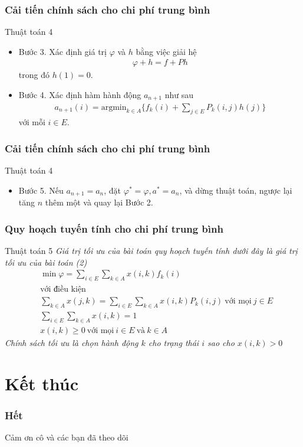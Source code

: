 \documentclass[12pt]{beamer}
\begin{document}
\begin{frame}
	\frametitle{ Cải tiến chính sách cho chi phí trung bình}
	\begin{block}{Thuật toán 4}
		\begin{itemize}
			\item
	 	Bước 3. Xác định giá trị $\varphi$ và $h$ bằng việc giải hệ
	\begin{align*}
	\varphi +h=f +Ph
	\end{align*} 
	trong đó $h(1)=0$.
	
\item
	Bước 4. Xác định hàm hành động $a_{n+1}$ như sau
	\begin{align*}
	a_{n+1}(i)=\mathrm{argmin}_{k \in A}\{f_k(i)+\sum_{j\in E}P_k(i,j)h(j)\}
	\end{align*}
	với mỗi $i \in E$.

		\end{itemize}
	\end{block}
\end{frame}

\begin{frame}
	\frametitle{ Cải tiến chính sách cho chi phí trung bình}
	\begin{block}{Thuật toán 4}
		\begin{itemize}
			\item
			Bước 5.
			Nếu $a_{n+1}=a_n$, đặt $\varphi^*=\varphi, a^*=a_n$, và dừng thuật toán, ngược lại tăng $n$ thêm một và quay lại Bước 2.
		\end{itemize}
	\end{block}
\end{frame}


\begin{frame}
	\frametitle{Quy hoạch tuyến tính cho chi phí trung bình}
\begin{block}{Thuật toán 5}
   \textit {Giá trị tối ưu của bài toán quy hoạch tuyến tính dưới đây là giá trị tối ưu của bài toán (2)
	\begin{align*}
	&\min \varphi =\sum_{i \in E} \sum_{k \in A}x(i,k)f_k(i)\\
	&\text{với điều kiện}\\
	&\sum_{k \in A}x(j,k)=\sum_{i \in E}\sum_{k \in A}x(i,k)P_k(i,j) \ \text{với mọi} \ j \in E\\
	&\sum_{i \in E}\sum_{k \in A}x(i,k)=1\\
	&x(i,k) \geq 0 \ \text{với mọi} \ i\in E \ \text{và} \ k\in A
	\end{align*}
	Chính sách tối ưu là chọn hành động $k$ cho trạng thái $i$ sao cho $x(i,k)>0$
}
	\end{block}
\end{frame}

\section{Kết thúc}
\begin{frame}
\frametitle{Hết}
\center
\huge
\color{red}
 Cảm ơn cô và các bạn đã theo dõi
\end{frame}
\end{document}
